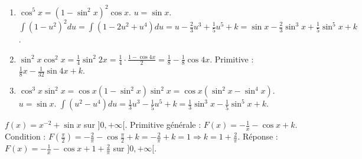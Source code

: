 \documentclass[11pt]{article}
\begin{document}
\begin{corrige}[Exercice 3]
\begin{enumerate}
  \item $\cos^5 x = (1-\sin^2 x)^2 \cos x$. $u=\sin x$. $\int (1-u^2)^2 du = \int (1-2u^2+u^4)du = u - \frac{2}{3}u^3 + \frac{1}{5}u^5 + k = \sin x - \frac{2}{3}\sin^3 x + \frac{1}{5}\sin^5 x + k$.
  \item $\sin^2 x \cos^2 x = \frac{1}{4}\sin^2 2x = \frac{1}{4}\cdot\frac{1-\cos 4x}{2} = \frac{1}{8} - \frac{1}{8}\cos 4x$.
  Primitive : $\frac{1}{8}x - \frac{1}{32}\sin 4x + k$.
  \item $\cos^3 x \sin^2 x = \cos x (1-\sin^2 x)\sin^2 x = \cos x (\sin^2 x - \sin^4 x)$. $u=\sin x$.
  $\int (u^2 - u^4)du = \frac{1}{3}u^3 - \frac{1}{5}u^5 + k = \frac{1}{3}\sin^3 x - \frac{1}{5}\sin^5 x + k$.
\end{enumerate}
\end{corrige}

\begin{corrige}[Exercice 4]
$f(x) = x^{-2} + \sin x$ sur $]0,+\infty[$.
Primitive générale : $F(x) = -\frac{1}{x} - \cos x + k$.
Condition : $F(\frac{\pi}{2}) = -\frac{2}{\pi} - \cos\frac{\pi}{2} + k = -\frac{2}{\pi} + k = 1 \Rightarrow k = 1 + \frac{2}{\pi}$.
Réponse : $F(x) = -\frac{1}{x} - \cos x + 1 + \frac{2}{\pi}$ sur $]0,+\infty[$.
\end{corrige}
\end{document}
